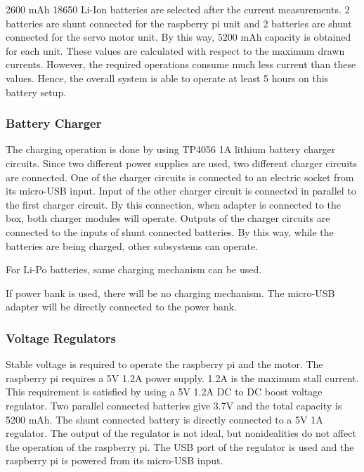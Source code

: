  
 
 2600 mAh 18650 Li-Ion batteries are selected after the current measurements. 2 batteries are shunt connected for the raspberry pi unit and 2 batteries are shunt connected for the servo motor unit. By this way, 5200 mAh capacity is obtained for each unit. These values are calculated with respect to the maximum drawn currents. However, the required operations consume much less current than these values. Hence, the overall system is able to operate at least 5 hours on this battery setup.
 
 
 \subsubsection{Battery Charger}
 
 The charging operation is done by using TP4056 1A lithium battery charger circuits. Since two different power supplies are used, two different charger circuits are connected. One of the charger circuits is connected to an electric socket from its micro-USB input. Input of the other charger circuit is connected in parallel to the first charger circuit. By this connection, when adapter is connected to the box, both charger modules will operate. Outputs of the charger circuits are connected to the inputs of shunt connected batteries. By this way, while the batteries are being charged, other subsystems can operate.
 
 For Li-Po batteries, same charging mechanism can be used.
 
 If power bank is used, there will be no charging mechanism. The micro-USB adapter will be directly connected to the power bank.
 
 
 \subsubsection{Voltage Regulators}
 
 Stable voltage is required to operate the raspberry pi and the motor.
 The raspberry pi requires a 5V 1.2A power supply. 1.2A is the maximum stall current. This requirement is satisfied by using a 5V 1.2A DC to DC boost voltage regulator. Two parallel connected batteries give 3.7V and the total capacity is 5200 mAh. The shunt connected battery is directly connected to a 5V 1A regulator. The output of the regulator is not ideal, but nonidealities do not affect the operation of the raspberry pi.
 The USB port of the regulator is used and the raspberry pi is powered from its micro-USB input.
 
